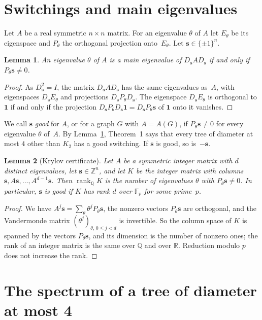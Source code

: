 \documentclass[11pt]{article}
\numberwithin{equation}{section}
\newtheorem{lemma}{Lemma}[section]
\theoremstyle{remark}
\newcommand{\Q}{\mathbb Q}
\newcommand{\Z}{\mathbb Z}
\newcommand{\R}{\mathbb R}
\newcommand{\F}{\mathbb F}
\newcommand{\s}{\mathbf s}
\newcommand{\one}{\mathbf 1}
\DeclareMathOperator{\rank}{rank}
\begin{document}
\section{Switchings and main eigenvalues}\label{sec:prelim}
Let $A$ be a real symmetric $n\times n$ matrix. For an eigenvalue $\theta$ of
$A$ let $E_\theta$ be its eigenspace and $P_\theta$ the orthogonal projection
onto~$E_\theta$. Let $\s\in\{\pm1\}^n$.

\begin{lemma}\label{lem:good}
An eigenvalue $\theta$ of $A$ is a main eigenvalue of $D_{\s}AD_{\s}$ if and
only if $P_\theta\s\ne0$.
\end{lemma}
\begin{proof}
As $D_{\s}^2=I$, the matrix $D_{\s}AD_{\s}$ has the same eigenvalues as~$A$,
with eigenspaces $D_{\s}E_\theta$ and projections $D_{\s}P_\theta D_{\s}$. The
eigenspace $D_{\s}E_\theta$ is orthogonal to $\one$ if and only if the
projection $D_{\s}P_\theta D_{\s}\one=D_{\s}P_\theta\s$ of $\one$ onto it
vanishes.
\end{proof}

We call $\s$ \emph{good} for $A$, or for a graph $G$ with $A=A(G)$, if
$P_\theta\s\ne0$ for every eigenvalue $\theta$ of~$A$. By
Lemma~\ref{lem:good}, Theorem~1 says that every tree of diameter at most $4$
other than $K_2$ has a good switching. If $\s$ is good, so is~$-\s$.

\begin{lemma}[Krylov certificate]\label{lem:krylov}
Let $A$ be a symmetric integer matrix with $d$ distinct eigenvalues, let
$\s\in\Z^n$, and let $K$ be the integer matrix with columns
$\s,A\s,\dots,A^{d-1}\s$. Then $\rank_\Q K$ is the number of eigenvalues
$\theta$ with $P_\theta\s\ne0$. In particular, $\s$ is good if $K$ has rank $d$
over $\F_p$ for some prime~$p$.
\end{lemma}
\begin{proof}
We have $A^j\s=\sum_\theta\theta^jP_\theta\s$, the nonzero vectors
$P_\theta\s$ are orthogonal, and the Vandermonde matrix
$(\theta^j)_{\theta,\,0\le j<d}$ is invertible. So the column space of $K$ is
spanned by the vectors $P_\theta\s$, and its dimension is the number of nonzero
ones; the rank of an integer matrix is the same over $\Q$ and over $\R$.
Reduction modulo $p$ does not increase the rank.
\end{proof}

\section{The spectrum of a tree of diameter at most 4}\label{sec:spec}
\end{document}
